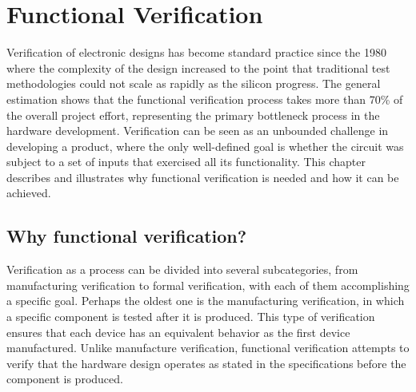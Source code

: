 



\chapter{Functional Verification}\label{functionalverification}
Verification of electronic designs has become standard practice since the 1980
where the complexity of the design increased to the point that traditional test
methodologies could not scale as rapidly as the silicon progress. The general
estimation \cite{foster2015trends} shows that the functional verification
process takes more than 70\% of the overall project effort, representing the
primary bottleneck process in the hardware development. Verification can be seen
as an unbounded challenge in developing a product, where the only well-defined
goal is whether the circuit was subject to a set of inputs that exercised all
its functionality. This chapter describes and illustrates why functional
verification is needed and how it can be achieved.

\section{Why functional verification?}\label{sec:fv:why}
Verification as a process can be divided into several subcategories, from
manufacturing verification to formal verification, with each of them
accomplishing a specific goal. Perhaps the oldest one is the manufacturing
verification, in which a specific component is tested after it is produced. This
type of verification ensures that each device has an equivalent behavior as the
first device manufactured. Unlike manufacture verification, functional
verification attempts to verify that the hardware design operates as stated in
the specifications before the component is produced.

